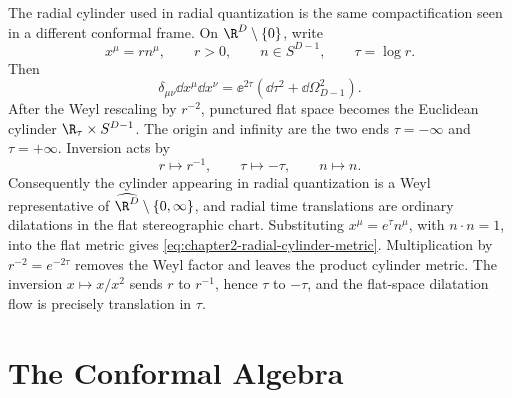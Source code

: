 The radial cylinder used in radial quantization is the same compactification
seen in a different conformal frame.  On \(\R^D\setminus\{0\}\), write
\[
  x^\mu=r n^\mu,\qquad
  r>0,\qquad
  n\in S^{D-1},\qquad
  \tau=\log r .
\]
Then
\begin{equation}
  \delta_{\mu\nu}\dd x^\mu\dd x^\nu
  =
  \ee^{2\tau}
  \left(\dd\tau^2+\dd\Omega_{D-1}^2\right).
  \label{eq:chapter2-radial-cylinder-metric}
\end{equation}
After the Weyl rescaling by \(r^{-2}\), punctured flat space becomes the
Euclidean cylinder \(\R_\tau\times S^{D-1}\).  The origin and infinity are the
two ends \(\tau=-\infty\) and \(\tau=+\infty\).  Inversion acts by
\[
  r\mapsto r^{-1},
  \qquad
  \tau\mapsto-\tau,
  \qquad
  n\mapsto n .
\]
Consequently the cylinder appearing in radial quantization is a Weyl
representative of \(\widehat{\R^D}\setminus\{0,\infty\}\), and radial time
translations are ordinary dilatations in the flat stereographic chart.
Substituting \(x^\mu=e^\tau n^\mu\), with \(n\cdot n=1\), into the flat metric
gives \eqref{eq:chapter2-radial-cylinder-metric}.  Multiplication by
\(r^{-2}=e^{-2\tau}\) removes the Weyl factor and leaves the product cylinder
metric.  The inversion \(x\mapsto x/x^2\) sends \(r\) to \(r^{-1}\), hence
\(\tau\) to \(-\tau\), and the flat-space dilatation flow is precisely
translation in \(\tau\).

\section{The Conformal Algebra}

